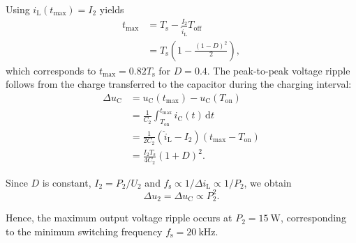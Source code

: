 \begin{solutionblock}
	Using $i_\mathrm{L}(t_\mathrm{max})=I_2$ yields
	\begin{equation}
		\begin{split}
			t_\mathrm{max}
			 & = T_\mathrm{s}
			-\frac{I_2}{\hat{i}_\mathrm{L}}T_\mathrm{off} \\
			 & = T_\mathrm{s}
			\left(1-\frac{(1-D)^2}{2}\right),
		\end{split}
	\end{equation}
	which corresponds to $t_\mathrm{max}=0.82T_\mathrm{s}$
	for $D=0.4$. The peak-to-peak voltage ripple follows from the charge
	transferred to the capacitor during the charging interval:
	\begin{equation}
		\begin{split}
			\Delta u_\mathrm{C}
			 & = u_\mathrm{C}(t_\mathrm{max})
			-u_\mathrm{C}(T_\mathrm{on})              \\
			 & = \frac{1}{C_2}
			\int_{T_\mathrm{on}}^{t_\mathrm{max}}
			i_\mathrm{C}(t)\,\mathrm{d}t              \\
			 & = \frac{1}{2C_2}
			\left(\hat{i}_\mathrm{L}-I_2\right)
			\left(t_\mathrm{max}-T_\mathrm{on}\right) \\
			 & = \frac{I_2T_\mathrm{s}}{4C_2}(1+D)^2.
		\end{split}
		\label{eq:ex03-bcm-capacitor-ripple}
	\end{equation}

	Since $D$ is constant, $I_2=P_2/U_2$ and
	$f_\mathrm{s}\propto 1/\Delta i_\mathrm{L}\propto 1/P_2$,
	we obtain
	\begin{equation}
		\Delta u_2=\Delta u_\mathrm{C}\propto P_2^2.
	\end{equation}

	Hence, the maximum output voltage ripple occurs at
	$P_2=\SI{15}{\watt}$, corresponding to the minimum switching
	frequency $f_\mathrm{s}=\SI{20}{\kilo\hertz}$.
\end{solutionblock}


